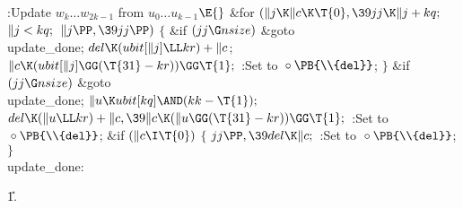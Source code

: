 \Y\B\4:Update $w_k\ldots w_{2k-1}$ from $u_0\ldots u_{k-1}$\X${}\E{}$\6
\&{for} ${}(\|j\K\|c\K\T{0},\39\\{jj}\K\|j+\\{kq};{}$ ${}\|j<\\{kq};{}$ ${}\|j%
\PP,\39\\{jj}\PP){}$\5
${}\{{}$\1\6
\&{if} ${}(\\{jj}\G\\{nsize}){}$\1\5
\&{goto} \\{update\_done};\2\6
${}\\{del}\K(\\{ubit}[\|j]\LL\\{kr})+\|c{}$;\6
${}\|c\K(\\{ubit}[\|j]\GG(\T{31}-\\{kr}))\GG\T{1};{}$\6
:Set  to ${}\circ\PB{\\{del}}$\X;\6
\4${}\}{}$\2\6
\&{if} ${}(\\{jj}\G\\{nsize}){}$\1\5
\&{goto} \\{update\_done};\2\6
${}\|u\K\\{ubit}[\\{kq}]\AND(\\{kk}-\T{1});{}$\6
${}\\{del}\K(\|u\LL\\{kr})+\|c,\39\|c\K(\|u\GG(\T{31}-\\{kr}))\GG\T{1};{}$\6
:Set  to ${}\circ\PB{\\{del}}$\X;\6
\&{if} ${}(\|c\I\T{0}){}$\5
${}\{{}$\1\6
${}\\{jj}\PP,\39\\{del}\K\|c;{}$\6
:Set  to ${}\circ\PB{\\{del}}$\X;\6
\4${}\}{}$\2\6
\4\\{update\_done}:\par
\U1.\fi

